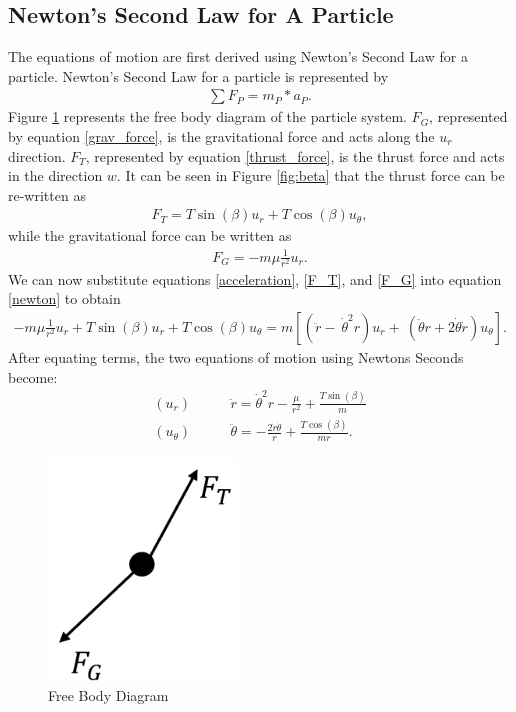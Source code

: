 \documentclass[]{article}
\begin{document}
\subsection{Newton's Second Law for A Particle}
The equations of motion are first derived using Newton's Second Law for a particle. Newton's Second Law for a particle is represented by
\begin{align}
	\sum{F_{P}} = m_{P} * a_{P}. \label{newton}
\end{align}
\vspace{2mm}\newline
Figure \ref{fig:FBD} represents the free body diagram of the particle system. \(F_{G}\), represented by equation \ref{grav_force}, is the gravitational force and acts along the \(u_{r}\) direction. \(F_{T}\), represented by equation \ref{thrust_force}, is the thrust force and acts in the direction \(w\). It can be seen in Figure \ref{fig:beta} that the thrust force can be re-written as 
\begin{align}
	F_{T} = T\sin(\beta)u_{r} + T\cos(\beta)u_{\theta}, \label{F_T}
\end{align}
while the gravitational force can be written as
\begin{align}
	F_{G} = -m\mu\frac{1}{r^2}u_{r}. \label{F_G}
\end{align}
We can now substitute equations \ref{acceleration},  \ref{F_T}, and \ref{F_G} into equation \ref{newton} to obtain
\begin{align*}
	 -m\mu\frac{1}{r^2}u_{r} + T\sin(\beta)u_{r} + T\cos(\beta)u_{\theta} = m[(\ddot{r} -\ \dot{\theta}^2r)u_{r} +\ (\ddot{\theta}r+2\dot{\theta}\dot{r})u_{\theta}]. 
\end{align*}
After equating terms, the two equations of motion using Newtons Seconds become:
\begin{align}
	(u_{r})\qquad      &  \ddot{r}      = \dot{\theta}^2r - \frac{\mu}{r^2} + \frac{T\sin(\beta)}{m} \label{eom1}\\
	(u_{\theta})\qquad &  \ddot{\theta} = -\frac{2\dot{r}\dot{\theta}}{r}   + \frac{T\cos(\beta)}{mr}. \label{eom2}
\end{align}
\begin{figure}
    \centering
	\includegraphics[width=50mm,scale=0.5]{FBD.png}
	\caption{Free Body Diagram}
	\label{fig:FBD}
\end{figure}
\end{document}

